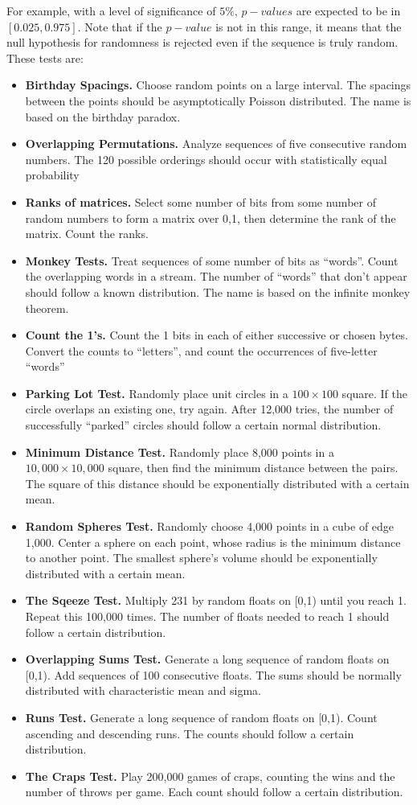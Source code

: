 For example, with a level of significance of $5\%$, $p-values$ are expected to be in
$[0.025, 0.975]$. Note that if the $p-value$ is not in this range, it means that the null
hypothesis for randomness is rejected even if the sequence is truly random. These
tests are:
\begin{itemize}
\item \textbf{Birthday Spacings.} Choose random points on a large interval. The spacings
between the points should be asymptotically Poisson distributed. The name
is based on the birthday paradox.
\item \textbf{Overlapping Permutations.} Analyze sequences of five consecutive random
numbers. The 120 possible orderings should occur with statistically equal
probability
\item \textbf{Ranks of matrices.} Select some number
of bits from some number of random numbers to form a matrix over 0,1, then
determine the rank of the matrix. Count the ranks.
\item \textbf{Monkey Tests.} Treat sequences of some number of bits as ``words''. Count
the overlapping words in a stream. The number of ``words'' that don't appear
should follow a known distribution. The name is based on the infinite monkey
theorem.
\item \textbf{Count the 1's.} Count the 1 bits in each of either successive
or chosen bytes. Convert the counts to ``letters'', and count the occurrences
of five-letter ``words''
\item \textbf{Parking Lot Test.} Randomly place unit circles in a $100 \times 100 $ square. If the
circle overlaps an existing one, try again. After 12,000 tries, the number of
successfully ``parked'' circles should follow a certain normal distribution.
\item \textbf{Minimum Distance Test.} Randomly place 8,000 points in a $10,000 \times 10,000$ 
square, then find the minimum distance between the pairs. The square of this
distance should be exponentially distributed with a certain mean.
\item \textbf{Random Spheres Test.} Randomly choose 4,000 points in a cube of edge 1,000.
Center a sphere on each point, whose radius is the minimum distance to another point. The smallest sphere's volume should be exponentially distributed
with a certain mean.
\item \textbf{The Sqeeze Test.} Multiply 231 by random floats on [0,1) until you reach 1.
Repeat this 100,000 times. The number of floats needed to reach 1 should
follow a certain distribution.
\item \textbf{Overlapping Sums Test.} Generate a long sequence of random floats on [0,1).
Add sequences of 100 consecutive floats. The sums should be normally distributed with characteristic mean and sigma.
\item \textbf{Runs Test.} Generate a long sequence of random floats on [0,1). Count ascending and descending runs. The counts should follow a certain distribution.
\item \textbf{The Craps Test.} Play 200,000 games of craps, counting the wins and the number
of throws per game. Each count should follow a certain distribution.
\end{itemize}

